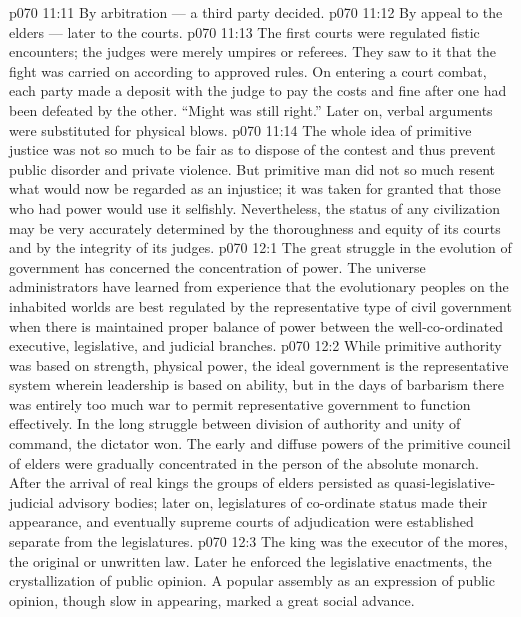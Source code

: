 \vs p070 11:11 \bibnobreakspace By arbitration --- a third party decided.
\vs p070 11:12 \bibnobreakspace By appeal to the elders --- later to the courts.
\vs p070 11:13 \pc The first courts were regulated fistic encounters; the judges were merely umpires or referees. They saw to it that the fight was carried on according to approved rules. On entering a court combat, each party made a deposit with the judge to pay the costs and fine after one had been defeated by the other. “Might was still right.” Later on, verbal arguments were substituted for physical blows.
\vs p070 11:14 The whole idea of primitive justice was not so much to be fair as to dispose of the contest and thus prevent public disorder and private violence. But primitive man did not so much resent what would now be regarded as an injustice; it was taken for granted that those who had power would use it selfishly. Nevertheless, the status of any civilization may be very accurately determined by the thoroughness and equity of its courts and by the integrity of its judges.
\vs p070 12:1 The great struggle in the evolution of government has concerned the concentration of power. The universe administrators have learned from experience that the evolutionary peoples on the inhabited worlds are best regulated by the representative type of civil government when there is maintained proper balance of power between the well\hyp{}co\hyp{}ordinated executive, legislative, and judicial branches.
\vs p070 12:2 \pc While primitive authority was based on strength, physical power, the ideal government is the representative system wherein leadership is based on ability, but in the days of barbarism there was entirely too much war to permit representative government to function effectively. In the long struggle between division of authority and unity of command, the dictator won. The early and diffuse powers of the primitive council of elders were gradually concentrated in the person of the absolute monarch. After the arrival of real kings the groups of elders persisted as quasi\hyp{}legislative\hyp{}judicial advisory bodies; later on, legislatures of co\hyp{}ordinate status made their appearance, and eventually supreme courts of adjudication were established separate from the legislatures.
\vs p070 12:3 The king was the executor of the mores, the original or unwritten law. Later he enforced the legislative enactments, the crystallization of public opinion. A popular assembly as an expression of public opinion, though slow in appearing, marked a great social advance.
